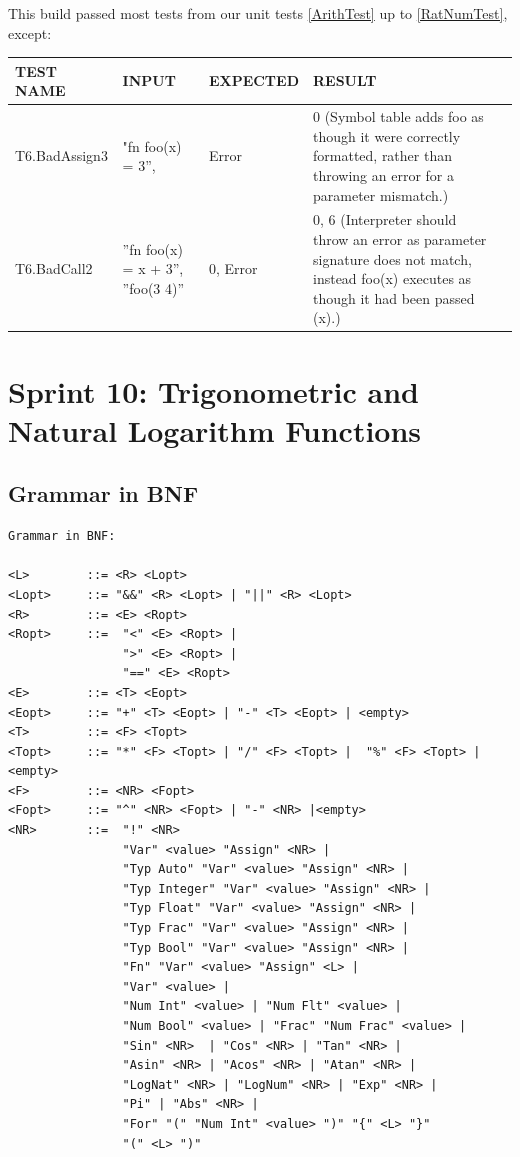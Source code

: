 \documentclass[a4paper, oneside, 11pt]{report}
\begin{document}
    This build passed most tests from our unit tests \ref{ArithTest} up to \ref{RatNumTest}, except:
    \begin{center}
        \begin{tabular}{|p{1.5in}|p{1.5in}|p{1in}|p{1.6in}|p{2.4in}|}
            \hline
            TEST NAME & INPUT & EXPECTED & RESULT \\
            \hline
            T6.BadAssign3 & "fn foo(x) = 3”, & Error & 0 (Symbol table adds foo as though it were correctly formatted, rather than throwing an error for a parameter mismatch.) \\
            \hline
            T6.BadCall2 & ”fn foo(x) = x + 3”, ”foo(3 4)” & 0, Error & 0, 6 (Interpreter should throw an error as parameter signature does not match, instead foo(x) executes as though it had been passed (x).) \\
            \hline
        \end{tabular}
    \end{center}
    \clearpage
    \section{Sprint 10: Trigonometric and Natural Logarithm Functions}
    \subsection{Grammar in BNF}
    \begin{verbatim}
Grammar in BNF:

<L>        ::= <R> <Lopt>
<Lopt>     ::= "&&" <R> <Lopt> | "||" <R> <Lopt>
<R>        ::= <E> <Ropt>
<Ropt>     ::=  "<" <E> <Ropt> |
                ">" <E> <Ropt> |
                "==" <E> <Ropt>
<E>        ::= <T> <Eopt>
<Eopt>     ::= "+" <T> <Eopt> | "-" <T> <Eopt> | <empty>
<T>        ::= <F> <Topt>
<Topt>     ::= "*" <F> <Topt> | "/" <F> <Topt> |  "%" <F> <Topt> |<empty>
<F>        ::= <NR> <Fopt>
<Fopt>     ::= "^" <NR> <Fopt> | "-" <NR> |<empty>
<NR>       ::=  "!" <NR>
                "Var" <value> "Assign" <NR> |
                "Typ Auto" "Var" <value> "Assign" <NR> |
                "Typ Integer" "Var" <value> "Assign" <NR> |
                "Typ Float" "Var" <value> "Assign" <NR> |
                "Typ Frac" "Var" <value> "Assign" <NR> |
                "Typ Bool" "Var" <value> "Assign" <NR> |
                "Fn" "Var" <value> "Assign" <L> |
                "Var" <value> |
                "Num Int" <value> | "Num Flt" <value> |
                "Num Bool" <value> | "Frac" "Num Frac" <value> |
                "Sin" <NR>  | "Cos" <NR> | "Tan" <NR> |
                "Asin" <NR> | "Acos" <NR> | "Atan" <NR> |
                "LogNat" <NR> | "LogNum" <NR> | "Exp" <NR> |
                "Pi" | "Abs" <NR> |
                "For" "(" "Num Int" <value> ")" "{" <L> "}"
                "(" <L> ")"
    \end{verbatim}
\end{document}
